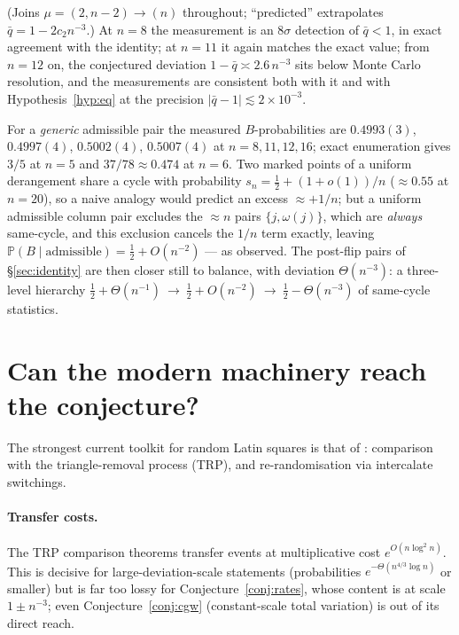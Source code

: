 \documentclass[11pt]{article}
\theoremstyle{definition}
\renewcommand{\Pr}{\mathbb{P}}
\begin{document}
\noindent
(Joins $\mu=(2,n-2)\to(n)$ throughout; ``predicted'' extrapolates
$\bar q=1-2c_2n^{-3}$.)  At $n=8$ the measurement is an $8\sigma$ detection
of $\bar q<1$, in exact agreement with the identity; at $n=11$ it again
matches the exact value; from $n=12$ on, the conjectured deviation
$1-\bar q\asymp2.6\,n^{-3}$ sits below Monte Carlo resolution, and the
measurements are consistent both with it and with
Hypothesis~\ref{hyp:eq} at the precision $|\bar q-1|\lesssim2\times10^{-3}$.

For a \emph{generic} admissible pair the measured $B$-probabilities are
$0.4993(3)$, $0.4997(4)$, $0.5002(4)$, $0.5007(4)$ at $n=8,11,12,16$; exact
enumeration
gives $3/5$ at $n=5$ and $37/78\approx0.474$ at $n=6$.  Two marked points of
a uniform derangement share a cycle with probability
$s_n=\tfrac12+(1+o(1))/n$ ($\approx0.55$ at $n=20$), so a naive analogy
would predict an excess $\approx+1/n$; but a uniform admissible column pair
excludes the $\approx n$ pairs $\{j,\omega(j)\}$, which are \emph{always}
same-cycle, and this exclusion cancels the $1/n$ term exactly, leaving
$\Pr(B\mid\text{admissible})=\tfrac12+O(n^{-2})$ --- as observed.  The
post-flip pairs of \S\ref{sec:identity} are then closer still to balance,
with deviation $\Theta(n^{-3})$: a three-level hierarchy
$\tfrac12+\Theta(n^{-1})\ \to\ \tfrac12+O(n^{-2})\ \to\ \tfrac12-\Theta(n^{-3})$
of same-cycle statistics.

\section{Can the modern machinery reach the conjecture?}\label{sec:kps}

The strongest current toolkit for random Latin squares is that of
\cite{KSSS22,KPS25}: comparison with the triangle-removal process (TRP), and
re-randomisation via intercalate switchings.

\paragraph{Transfer costs.}  The TRP comparison theorems transfer events at
multiplicative cost $e^{O(n\log^2n)}$.  This is decisive for
large-deviation-scale statements (probabilities $e^{-\Theta(n^{4/3}\log n)}$
or smaller) but is far too lossy for Conjecture~\ref{conj:rates}, whose
content is at scale $1\pm n^{-3}$; even Conjecture~\ref{conj:cgw}
(constant-scale total variation) is out of its direct reach.
\end{document}

